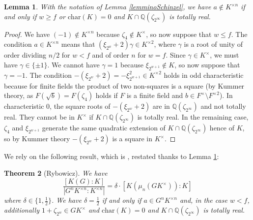 \documentclass[11pt, a4paper]{amsart}
\newtheorem {thm}{Theorem}
\newtheorem {lem}[thm]{Lemma}
\theoremstyle{definition}
\newcommand{\Q}{\mathbb{Q}}
\newcommand{\ch}{\mathrm{char}}
\renewcommand{\geq}{\geqslant}
\renewcommand{\leq}{\leqslant}
\begin{document}
\begin{lem}\label{orders}
With the notation of Lemma \ref{lemminoSchinzel}, we have $a\notin K^{\times n}$ if and only if 
$w\geq f$ or $\ch(K)=0$ and $K\cap \Q(\zeta_{2^\infty})$ is totally real.
\end{lem}
\begin{proof}
We have $(-1)\notin K^{\times n}$ because $\zeta_4\notin K^\times$, so now suppose that $w\leq f$.
The condition $a\in K^{\times n}$ means that $(\xi_{2^{w}}+2)\gamma \in K^{\times 2}$, where $\gamma$ is a root of unity of order dividing $n/2$ for $w<f$ and of order $n$ for $w=f$. Since $\gamma\in K^\times$, we must have $\gamma\in \{\pm 1\}$. We cannot have $\gamma=1$ because $\xi_{2^{w+1}}\notin K$, so now suppose that $\gamma=-1$. 
The condition $-(\xi_{2^{w}}+2)=-\xi_{2^{w+1}}^2 \in K^{\times 2}$ holds in odd characteristic because for finite fields the product of two non-squares is a square (by Kummer theory, as $F(\sqrt{b})=F(\zeta_4)$ holds if $F$ is a finite field and  $b\in F^\times\setminus F^{\times  2}$). In characteristic $0$, the square roots of $-(\xi_{2^{w}}+2)$ are in $\Q(\zeta_{2^\infty})$ and not totally real. They cannot be in $K^\times$ if $K\cap \Q(\zeta_{2^\infty})$ is totally real. In the remaining case, $\zeta_4$ and $\xi_{2^{w+1}}$ generate the same quadratic extension of $K\cap \Q(\zeta_{2^\infty})$ hence of $K$, so by Kummer theory $-(\xi_{2^{w}}+2)$ is a square in $K^\times$.
\end{proof}

We rely on the following result, which is \cite[Theorem 2.4]{Rybowicz}, restated thanks to Lemma \ref{orders}:

\begin{thm}[Rybowicz]\label{Ryb2}
We have 
$$\frac{[K(G):K]}{|G^nK^{\times n}:K^{\times n}|}=\delta \cdot [K(\mu_n(GK^\times)):K]$$
where $\delta\in \{1,\frac{1}{2}\}$.
We have $\delta=\frac{1}{2}$ if and only if $a\in G^nK^{\times n}$ and, in the case $w<f$, additionally $1+\zeta_{2^w}\in GK^\times$ and $\ch(K)=0$ and $K\cap \Q(\zeta_{2^\infty})$ is totally real.
\end{thm}
\end{document}
